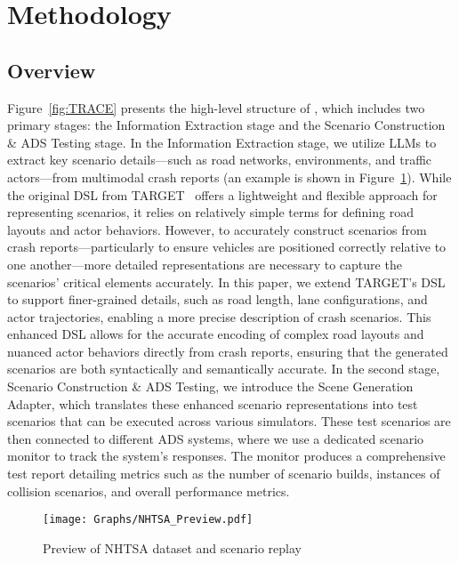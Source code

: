\section{Methodology}
\label{sec:methodology}
\subsection{Overview}
Figure~\ref{fig:TRACE} presents the high-level structure of {\tool}, which includes two primary stages: the Information Extraction stage and the Scenario Construction \& ADS Testing stage. In the Information Extraction stage, we utilize LLMs to extract key scenario details—such as road networks, environments, and traffic actors—from multimodal crash reports (an example is shown in Figure~\ref{fig:NHTSA_LCTGen}). While the original DSL from TARGET~\cite{deng2023targetautomatedscenariogeneration} offers a lightweight and flexible approach for representing scenarios, it relies on relatively simple terms for defining road layouts and actor behaviors. However, to accurately construct scenarios from crash reports—particularly to ensure vehicles are positioned correctly relative to one another—more detailed representations are necessary to capture the scenarios' critical elements accurately. In this paper, we extend TARGET’s DSL to support finer-grained details, such as road length, lane configurations, and actor trajectories, enabling a more precise description of crash scenarios. This enhanced DSL allows for the accurate encoding of complex road layouts and nuanced actor behaviors directly from crash reports, ensuring that the generated scenarios are both syntactically and semantically accurate. In the second stage, Scenario Construction \& ADS Testing, we introduce the Scene Generation Adapter, which translates these enhanced scenario representations into test scenarios that can be executed across various simulators. These test scenarios are then connected to different ADS systems, where we use a dedicated scenario monitor to track the system’s responses. The monitor produces a comprehensive test report detailing metrics such as the number of scenario builds, instances of collision scenarios, and overall performance metrics.

\begin{figure}[!t]
  \centering
  \texttt{[image: Graphs/NHTSA\_Preview.pdf]}
  \caption{Preview of NHTSA dataset and scenario replay}
  \label{fig:NHTSA_LCTGen}
\vspace{-5mm}  
\end{figure}



